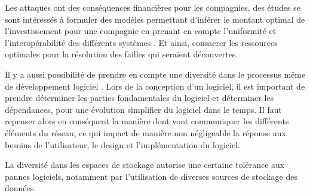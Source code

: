 Les attaques ont des conséquences financières pour les compagnies, des études se sont intéressés à formuler des modèles permettant d’inférer le montant optimal de l’investissement pour une compagnie en prenant en compte l’uniformité et l’interopérabilité des différents systèmes \cite{informationSecurity}. Et ainsi, consacrer les ressources optimales pour la résolution des failles qui seraient découvertes. 

Il y a aussi possibilité de prendre en compte une diversité dans le processus même de développement logiciel \cite{processDiversity}. 
Lors de la conception d’un logiciel, il est important de prendre déterminer les parties fondamentales du logiciel et déterminer les dépendances, pour une évolution simplifier du logiciel dans le temps. Il faut repenser alors en conséquent la manière dont vont communiquer les différents éléments du réseau, ce qui impact de manière non négligeable la réponse aux besoins de l'utilisateur, le design et l'implémentation du logiciel.

La diversité dans les espaces de stockage  autorise une certaine tolérance aux pannes logiciels\cite{dataDiversity}, notamment par l'utilisation de diverses sources de stockage des données.

